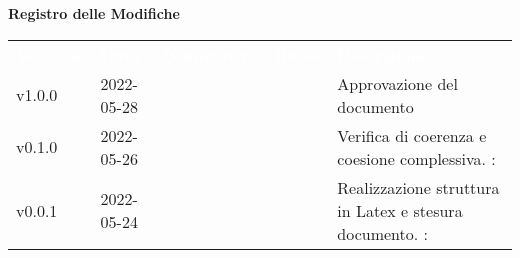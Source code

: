 

{\LARGE{\textbf{Registro delle Modifiche}}} \\
\begin{table}[!htbp]
	\renewcommand{\arraystretch}{1.5}
	\begin{tabular}{ m{}<{\centering}  m{}<{\centering}  m{}<{\centering}  m{}<{\centering}  m{}<{\centering} }
		\rowcolor{darkblue}
		\textcolor{white}{\textbf{Versione}} & \textcolor{white}{\textbf{Data}} & \textcolor{white}{\textbf{Nominativo}} & \textcolor{white}{\textbf{Ruolo}} & \textcolor{white}{\textbf{Descrizione}}                              \\
		v1.0.0                               & 2022-05-28                    & \MG                                       & \RE                               & Approvazione del documento                                           \\

		v0.1.0                               & 2022-05-26                      & \GC                                    & \AN                               & Verifica di coerenza e coesione complessiva. \VE: \textit{\PV}          \\

		v0.0.1                               & 2022-05-24                       & \GC                                    & \AN                               & Realizzazione struttura in Latex e stesura documento. \VE: \textit{\PV} \\
	\end{tabular}
\end{table}

\pagebreak